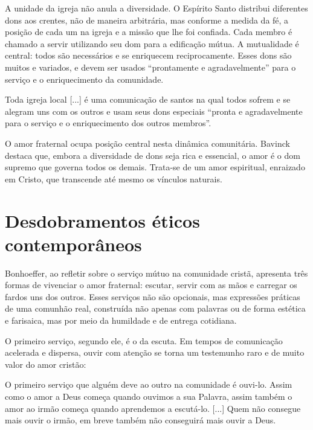 A unidade da igreja não anula a diversidade. O Espírito Santo distribui diferentes dons aos crentes, não de maneira arbitrária, mas conforme a medida da fé, a posição de cada um na igreja e a missão que lhe foi confiada. \cite[p.~380]{bavinck2012} Cada membro é chamado a servir utilizando seu dom para a edificação mútua. A mutualidade é central: todos são necessários e se enriquecem reciprocamente. Esses dons são muitos e variados, e devem ser usados ``prontamente e agradavelmente'' para o serviço e o enriquecimento da comunidade.\cite[p.~380]{bavinck2012}

\begin{citacao}
    Toda igreja local [...] é uma comunicação de santos na qual todos sofrem e se alegram uns com os outros e usam seus dons especiais ``pronta e agradavelmente para o serviço e o enriquecimento dos outros membros''. \cite[p.~380]{bavinck2012}
\end{citacao}

O amor fraternal ocupa posição central nesta dinâmica comunitária. Bavinck destaca que, embora a diversidade de dons seja rica e essencial, o amor é o dom supremo que governa todos os demais. \cite[p.~304]{bavinck2012} Trata-se de um amor espiritual, enraizado em Cristo, que transcende até mesmo os vínculos naturais. \cite[p.~304]{bavinck2012}

\section{Desdobramentos éticos contemporâneos}

Bonhoeffer, ao refletir sobre o serviço mútuo na comunidade cristã, apresenta três formas de vivenciar o amor fraternal: escutar, servir com as mãos e carregar os fardos uns dos outros. Esses serviços não são opcionais, mas expressões práticas de uma comunhão real, construída não apenas com palavras ou de forma estética e farisaica, mas por meio da humildade e de entrega cotidiana.

O primeiro serviço, segundo ele, é o da escuta. Em tempos de comunicação acelerada e dispersa, ouvir com atenção se torna um testemunho raro e de muito valor do amor cristão:

\begin{citacao}
    O primeiro serviço que alguém deve ao outro na comunidade é ouvi-lo. Assim como o amor a Deus começa quando ouvimos a sua Palavra, assim também o amor ao irmão começa quando aprendemos a escutá-lo. [...] Quem não consegue mais ouvir o irmão, em breve também não conseguirá mais ouvir a Deus. \cite[pp.~75--76]{bonhoeffer1997}
\end{citacao}

